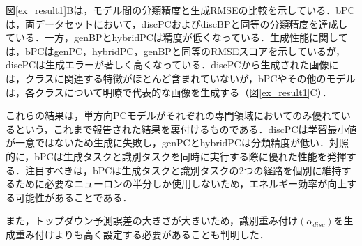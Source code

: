 \documentclass[a4paper, titlepage]{jsarticle}
\begin{document}
図\ref{ex_result1}Bは，モデル間の分類精度と生成RMSEの比較を示している．bPCは，両データセットにおいて，discPCおよびdiscBPと同等の分類精度を達成している．一方，genBPとhybridPCは精度が低くなっている．生成性能に関しては，bPCはgenPC，hybridPC，genBPと同等のRMSEスコアを示しているが，discPCは生成エラーが著しく高くなっている．discPCから生成された画像には，クラスに関連する特徴がほとんど含まれていないが，bPCやその他のモデルは，各クラスについて明瞭で代表的な画像を生成する（図\ref{ex_result1}C）．
\par
これらの結果は，単方向PCモデルがそれぞれの専門領域においてのみ優れているという，これまで報告された結果を裏付けるものである．discPCは学習最小値が一意ではないため生成に失敗し，genPCとhybridPCは分類精度が低い．対照的に，bPCは生成タスクと識別タスクを同時に実行する際に優れた性能を発揮する．注目すべきは，bPCは生成タスクと識別タスクの2つの経路を個別に維持するために必要なニューロンの半分しか使用しないため，エネルギー効率が向上する可能性があることである．
\par
また，トップダウン予測誤差の大きさが大きいため，識別重み付け$(\alpha_{disc})$を生成重み付けよりも高く設定する必要があることも判明した．
\end{document}
